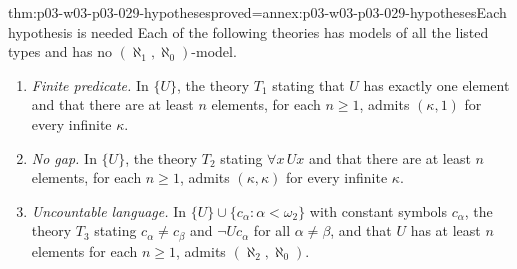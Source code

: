 \begin{hbtheorem}{thm:p03-w03-p03-029-hypotheses}{proved=annex:p03-w03-p03-029-hypotheses}{Each hypothesis is needed}
Each of the following theories has models of all the listed types and has no
\((\aleph_1,\aleph_0)\)-model.
\begin{enumerate}
  \item \emph{Finite predicate.} In \(\{U\}\), the theory \(T_1\) stating
        that \(U\) has exactly one element and that there are at least
        \(n\) elements, for each \(n\geq1\), admits \((\kappa,1)\) for every
        infinite \(\kappa\).
  \item \emph{No gap.} In \(\{U\}\), the theory \(T_2\) stating
        \(\forall x\,Ux\) and that there are at least \(n\) elements, for
        each \(n\geq1\), admits \((\kappa,\kappa)\) for every infinite
        \(\kappa\).
  \item \emph{Uncountable language.} In \(\{U\}\cup\{c_\alpha:\alpha<\omega_2\}\)
        with constant symbols \(c_\alpha\), the theory \(T_3\) stating
        \(c_\alpha\neq c_\beta\) and \(\neg Uc_\alpha\) for all
        \(\alpha\neq\beta\), and that \(U\) has at least \(n\) elements for
        each \(n\geq1\), admits \((\aleph_2,\aleph_0)\).
\end{enumerate}
\end{hbtheorem}

